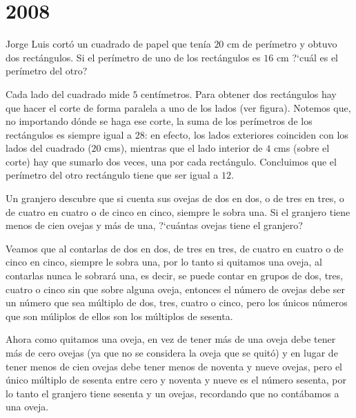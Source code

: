 \chapter{2008}
\label{cha:2008}

\begin{Problema}{1}
  Jorge Luis cort\'o un cuadrado de papel que ten\'ia $20$ cm de
  per\'imetro y obtuvo dos rect\'angulos. Si el per\'imetro de uno de
  los rect\'angulos es $16$ cm ?`cu\'al es el per\'imetro del otro?
\end{Problema}

\begin{Solucion}
  Cada lado del cuadrado mide $5$ cent\'imetros. Para obtener dos
  rect\'angulos hay que hacer el corte de forma paralela a uno de los
  lados (ver figura). Notemos que, no importando d\'onde se haga ese
  corte, la suma de los per\'imetros de los rect\'angulos es siempre
  igual a $28$: en efecto, los lados exteriores coinciden con los
  lados del cuadrado ($20$ cms), mientras que el lado interior de $4$
  cms (sobre el corte) hay que sumarlo dos veces, una por cada
  rect\'angulo. Concluimos que el per\'imetro del otro rect\'angulo
  tiene que ser igual a $12$.
\end{Solucion}

\begin{Problema}{2}
  Un granjero descubre que si cuenta sus ovejas de dos en dos, o de
  tres en tres, o de cuatro en cuatro o de cinco en cinco, siempre le
  sobra una. Si el granjero tiene menos de cien ovejas y m\'as de una,
  ?`cu\'antas ovejas tiene el granjero?
\end{Problema}

\begin{Solucion}
  Veamos que al contarlas de dos en dos, de tres en tres, de cuatro en
  cuatro o de cinco en cinco, siempre le sobra una, por lo tanto si
  quitamos una oveja, al contarlas nunca le sobrar\'a una, es decir,
  se puede contar en grupos de dos, tres, cuatro o cinco sin que sobre
  alguna oveja, entonces el n\'umero de ovejas debe ser un n\'umero
  que sea m\'ultiplo de dos, tres, cuatro o cinco, pero los \'unicos
  n\'umeros que son m\'uliplos de ellos son los m\'ultiplos de
  sesenta.

  Ahora como quitamos una oveja, en vez de tener m\'as de una oveja
  debe tener m\'as de cero ovejas (ya que no se considera la oveja que
  se quit\'o) y en lugar de tener menos de cien ovejas debe tener
  menos de noventa y nueve ovejas, pero el \'unico m\'ultiplo de
  sesenta entre cero y noventa y nueve es el n\'umero sesenta, por lo
  tanto el granjero tiene sesenta y un ovejas, recordando que no
  cont\'abamos a una oveja.
\end{Solucion}

